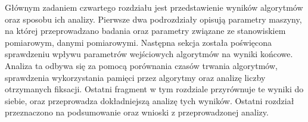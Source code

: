 Głównym zadaniem czwartego rozdziału jest przedstawienie wyników algorytmów oraz sposobu ich analizy. Pierwsze dwa podrozdziały opisują parametry maszyny, na której przeprowadzano badania oraz parametry związane ze stanowiskiem pomiarowym, danymi pomiarowymi. Następna sekcja została poświęcona sprawdzeniu wpływu parametrów wejściowych algorytmów na wyniki końcowe. Analiza ta odbywa się za pomocą porównania czasów trwania algorytmów, sprawdzenia wykorzystania pamięci przez algorytmy oraz analizę liczby otrzymanych fiksacji. Ostatni fragment w tym rozdziale przyrównuje te wyniki do siebie, oraz przeprowadza dokładniejszą analizę tych wyników. Ostatni rozdział przeznaczono na podsumowanie oraz wnioski z przeprowadzonej analizy.